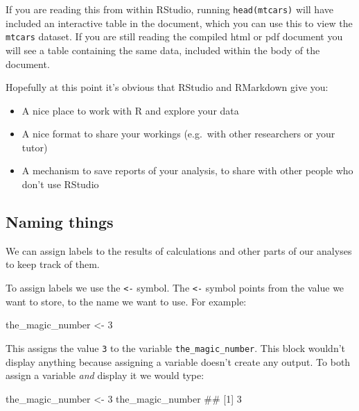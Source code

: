 \documentclass[]{article}
\newenvironment{Shaded}{\begin{snugshade}}{\end{snugshade}}
\newcommand{\DecValTok}[1]{\textcolor[rgb]{0.00,0.00,0.81}{#1}}
\newcommand{\StringTok}[1]{\textcolor[rgb]{0.31,0.60,0.02}{#1}}
\newcommand{\NormalTok}[1]{#1}
\providecommand{\tightlist}{%
  \setlength{\itemsep}{0pt}\setlength{\parskip}{0pt}}
\theoremstyle{definition}
\theoremstyle{definition}
\theoremstyle{definition}
\theoremstyle{remark}
\begin{document}
If you are reading this from within RStudio, running
\texttt{head(mtcars)} will have included an interactive table in the
document, which you can use this to view the \texttt{mtcars} dataset. If
you are still reading the compiled html or pdf document you will see a
table containing the same data, included within the body of the
document.

Hopefully at this point it's obvious that RStudio and RMarkdown give
you:

\begin{itemize}
\tightlist
\item
  A nice place to work with R and explore your data
\item
  A nice format to share your workings (e.g.~with other researchers or
  your tutor)
\item
  A mechanism to save reports of your analysis, to share with other
  people who don't use RStudio
\end{itemize}

\subsection*{Naming things}\label{variables}

We can assign labels to the results of calculations and other parts of
our analyses to keep track of them.

To assign labels we use the \texttt{\textless{}-} symbol. The
\texttt{\textless{}-} symbol points from the value we want to store, to
the name we want to use. For example:

\begin{Shaded}
\begin{Highlighting}[]
\NormalTok{the_magic_number <-}\StringTok{ }\DecValTok{3}
\end{Highlighting}
\end{Shaded}

This assigns the value \texttt{3} to the variable
\texttt{the\_magic\_number}. This block wouldn't display anything
because assigning a variable doesn't create any output. To both assign a
variable \emph{and} display it we would type:

\begin{Shaded}
\begin{Highlighting}[]
\NormalTok{the_magic_number <-}\StringTok{ }\DecValTok{3}
\NormalTok{the_magic_number}
\NormalTok{## [1] 3}
\end{Highlighting}
\end{Shaded}
\end{document}
